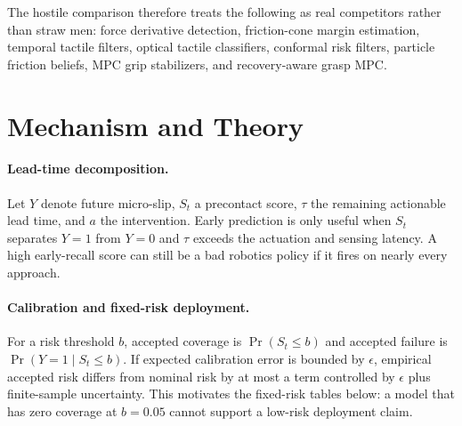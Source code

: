 \documentclass{article}
\begin{document}
The hostile comparison therefore treats the following as real competitors rather than straw men: force derivative detection, friction-cone margin estimation, temporal tactile filters, optical tactile classifiers, conformal risk filters, particle friction beliefs, MPC grip stabilizers, and recovery-aware grasp MPC. \citep{r101016jcej2023146279,r101109robot1996509203,r260611184v1,r101109tro20243502197,r103390app13063886,r101002rcs2491} \citep{r103390s19040966,r103389frobt20261735467,r101016jengfailanal2026110526,r101109icra55743202511127381,r101016jmeasurement2024114249,r101002adrr202500091} \citep{r101109lra20192930477,r101016jsna201907007,r101109icra57147202410611504,r101002rcs2325,r103389frobt2022913930,r103389frobt2021631371} \citep{r101016jisatra201812031,r101049csy270036,r1015607rss2022xviii070,r101109lra20213061378,r101109lra20253568616,r101109jsen20253547369} \citep{r220509430v2,r101017s0263574704001535,r101109robosoft55895202310121967,r103390machines10090720,r260609337v2,r260212532v1} \citep{r260223648v1,r101109icra55743202511127723,r101109lra20253604723,r101109lra20263662618,r1010800169186420181525075,r101007s41315022002600} \citep{r1011093516914388,r101108ir0120250033,r101109tro20203005547,r101007s1336902206763z,r1010800042311420252606345,r101007s41315025004948} \citep{r101109lra20253572817,r101109robot20041308042,r101016jprocs202310646,r101109robio20116181676,r191003973v1,r1054254275388182025ad28420} \citep{r101109robot20084543605,r101016jsna2025117179,r1011093mnano65639202511261038,r10114537942093794293,r101109newcas64648202511107072,r101299jsmermd200183}

\section{Mechanism and Theory}
\paragraph{Lead-time decomposition.} Let $Y$ denote future micro-slip, $S_t$ a precontact score, $\tau$ the remaining actionable lead time, and $a$ the intervention. Early prediction is only useful when $S_t$ separates $Y=1$ from $Y=0$ and $\tau$ exceeds the actuation and sensing latency. A high early-recall score can still be a bad robotics policy if it fires on nearly every approach.

\paragraph{Calibration and fixed-risk deployment.} For a risk threshold $b$, accepted coverage is $\Pr(S_t \le b)$ and accepted failure is $\Pr(Y=1 \mid S_t \le b)$. If expected calibration error is bounded by $\epsilon$, empirical accepted risk differs from nominal risk by at most a term controlled by $\epsilon$ plus finite-sample uncertainty. This motivates the fixed-risk tables below: a model that has zero coverage at $b=0.05$ cannot support a low-risk deployment claim.
\end{document}
